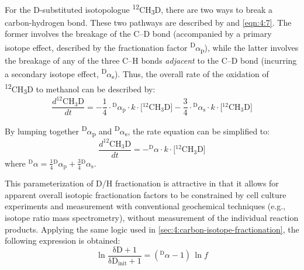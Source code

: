 For the D-substituted isotopologue
\textsuperscript{12}CH\textsubscript{3}D, there are two ways to break a
carbon-hydrogen bond. These two pathways are described by  and \ref{eqn:4:7}. The former involves the breakage of the C--D bond (accompanied by
a primary isotope effect, described by the fractionation factor
\textsuperscript{D}$\alpha$\textsubscript{p}), while the latter involves the
breakage of any of the three C--H bonds \emph{adjacent} to the C--D bond
(incurring a secondary isotope effect,
\textsuperscript{D}$\alpha$\textsubscript{s}). Thus, the overall rate of the
oxidation of \textsuperscript{12}CH\textsubscript{3}D to methanol can be
described by:
\begin{equation}\label{eqn:4:14} 
\frac{d_{}^{\mathrm{12}}{\mathrm{C}\mathrm{H}_{\mathrm{3}}\mathrm{D}}}{{dt}} = \textstyle - \frac{1}{4} \cdot{}_{}^{\mathrm{D}}\alpha_{\mathrm{p}} \cdot k \cdot \bigl\lbrack{}_{}^{\mathrm{12}}{\mathrm{C}\mathrm{H}_{\mathrm{3}}\mathrm{D}} \bigr\rbrack - \frac{3}{4} \cdot{}_{}^{\mathrm{D}}\alpha_{\mathrm{s}} \cdot k \cdot \bigl\lbrack{}_{}^{\mathrm{12}}{\mathrm{C}\mathrm{H}_{\mathrm{3}}\mathrm{D}} \bigr\rbrack
\end{equation}

By lumping together \textsuperscript{D}$\alpha$\textsubscript{p} and
\textsuperscript{D}$\alpha$\textsubscript{s}, the rate equation can be
simplified to:
\begin{equation}\label{eqn:4:15}
\frac{d_{}^{\mathrm{12}}{\mathrm{C}\mathrm{H}_{\mathrm{3}}\mathrm{D}}}{{dt}} = \textstyle -_{}^{\mathrm{D}}\alpha \cdot k \cdot \bigl\lbrack{}_{}^{\mathrm{12}}{\mathrm{C}\mathrm{H}_{\mathrm{3}}\mathrm{D}} \bigr\rbrack
\end{equation}
where
\(_{}^{\mathrm{D}}\alpha = \frac{1}{4}{}_{}^{\mathrm{D}}\alpha_{\mathrm{p}} + \frac{3}{4}{}_{}^{\mathrm{D}}\alpha_{\mathrm{s}}\).

This parameterization of D/H fractionation is attractive in that it
allows for apparent overall isotopic fractionation factors to be
constrained by cell culture experiments and measurement with
conventional geochemical techniques (e.g., isotope ratio mass
spectrometry), without measurement of the individual reaction products.
Applying the same logic used in \autoref{sec:4:carbon-isotope-fractionation}, the following expression is
obtained:
\begin{equation}\label{eqn:4:16}
\ln\frac{\mathrm{\text{δD}} + 1}{\mathrm{\text{δD}}_{\mathrm{\text{init}}} + 1} = \left(_{}^{\mathrm{D}}\alpha - 1 \right)\,\ln f
\end{equation}

